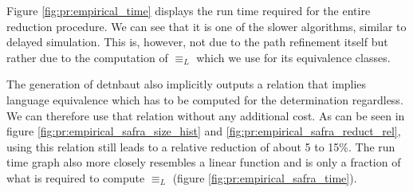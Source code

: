 Figure \ref{fig:pr:empirical_time} displays the run time required for the entire reduction procedure. We can see that it is one of the slower algorithms, similar to delayed simulation. This is, however, not due to the path refinement itself but rather due to the computation of $\equiv_L$ which we use for its equivalence classes.

The generation of \textsf{detnbaut} also implicitly outputs a relation that implies language equivalence which has to be computed for the determination regardless. We can therefore use that relation without any additional cost. As can be seen in figure \ref{fig:pr:empirical_safra_size_hist} and \ref{fig:pr:empirical_safra_reduct_rel}, using this relation still leads to a relative reduction of about 5 to 15\%. The run time graph also more closely resembles a linear function and is only a fraction of what is required to compute $\equiv_L$ (figure \ref{fig:pr:empirical_safra_time}).

